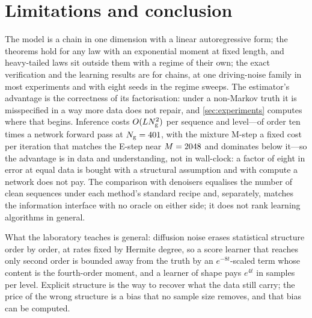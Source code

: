 \section{Limitations and conclusion}
\label{sec:conclusion}

The model is a chain in one dimension with a linear autoregressive form; the theorems
hold for any law with an exponential moment at fixed length, and heavy-tailed laws sit
outside them with a regime of their own; the exact verification and the learning
results are for chains, at one driving-noise family in most experiments and with eight
seeds in the regime sweeps. The estimator's advantage is the correctness of its
factorisation: under a non-Markov truth it is misspecified in a way more data does not
repair, and \cref{sec:experiments} computes where that begins. Inference costs
$O(LN_{\mathrm{g}}^2)$ per sequence and level---of order ten times a network forward pass at
$N_{\mathrm{g}}=401$, with the mixture M-step a fixed cost per iteration that matches the E-step near
$M=2048$ and dominates below it---so the advantage
is in data and understanding, not in wall-clock: a factor of eight in error at equal data
is bought with a structural assumption and with compute a network does not pay. The comparison with denoisers equalises the number of clean sequences under each
method's standard recipe and, separately, matches the information interface with no
oracle on either side; it does not rank learning algorithms in general.

What the laboratory teaches is general: diffusion noise erases statistical structure
order by order, at rates fixed by Hermite degree, so a score learner that reaches only
second order is bounded away from the truth by an $e^{-8t}$-scaled term whose content is
the fourth-order moment, and a learner of shape pays $e^{4t}$ in samples per level.
Explicit structure is the way to recover what the data still carry; the price of the
wrong structure is a bias that no sample size removes, and that bias can be computed.
